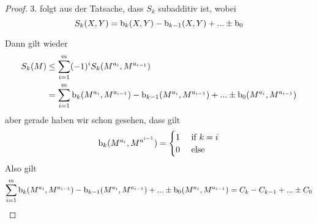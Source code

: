 \begin{proof}
    3. folgt aus der Tatsache, dass $S_k$ subadditiv ist, wobei 
    \[ 
      S_k(X, Y) 
      = { \operatorname{b} }_k(X, Y) - { \operatorname{b} }_{k - 1}(X, Y) + ... \pm { \operatorname{b} }_{0} 
    \]

    Dann gilt wieder
    \begin{align*} 
        S_k (M) 
            & \leq \sum_{i = 1}^m (-1)^i S_k(M^{a_i}, M^{a_{i-1}}) \\
            & = \sum_{i = 1}^m { \operatorname{b} }_k(M^{a_i}, M^{a_{i-1}}) 
            - { \operatorname{b} }_{k - 1}(M^{a_i}, M^{a_{i-1}})
            + ... \pm { \operatorname{b} }_0(M^{a_i}, M^{a_{i-1}})
    \end{align*}
    aber gerade haben wir schon gesehen, dass gilt
    \[ 
        { \operatorname{b} }_k(M^{a_i}, M^{a^{i-1}}) = 
            \begin{cases}
                1 & \text{ if } k = i \\
                0 & \text{ else }
            \end{cases}
    \]
    Also gilt
    \[ 
        \sum_{i = 1}^m { \operatorname{b} }_k(M^{a_i}, M^{a_{i-1}}) 
            - { \operatorname{b} }_{k - 1}(M^{a_i}, M^{a_{i-1}})
            + ... \pm { \operatorname{b} }_0(M^{a_i}, M^{a_{i-1}})
        = C_k - C_{k - 1} + ... \pm C_0
    \]

\end{proof}
